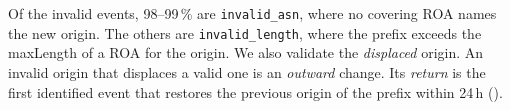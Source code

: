 
Of the invalid events, 98--99\,\% are \texttt{invalid\_asn}, where no covering ROA names the new origin.
The others are \texttt{invalid\_length}, where the prefix exceeds the maxLength of a ROA for the origin.
We also validate the \emph{displaced} origin.
An invalid origin that displaces a valid one is an \emph{outward} change.
Its \emph{return} is the first identified event that restores the previous origin of the prefix within 24\,h ().

